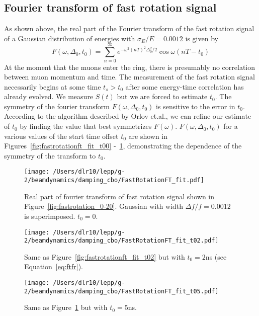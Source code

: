 \documentclass[10pt]{article}
\begin{document}
\subsection{Fourier transform of fast rotation signal}
As shown above, the real part of the Fourier transform of the fast rotation signal of a Gaussian distribution of energies with $\sigma_E/E = 0.0012$ is given by
\begin{equation}
F(\omega, \Delta_0,t_0)=\sum_{n=0}^\infty e^{-\omega^2(nT)^2\Delta_0^2/2}\cos\omega(nT-t_0)\label{eq:ftfr}
\end{equation}
At the moment that the muons enter the ring, there is presumably no correlation between muon momentum and time. The measurement of the fast rotation signal
necessarily begins at some time $t_s > t_0$ after some energy-time correlation has already evolved. We measure $S(t)$ but we are forced to
estimate $t_0$. The symmetry of the fourier transform $F(\omega,\Delta_0,t_0)$ is sensitive to the error in $t_0$.
According to the algorithm described by Orlov et.al.\cite{orlov}, we can refine our estimate of $t_0$ by finding the value that best symmetrizes $F(\omega)$.
$F(\omega,\Delta_0,t_0)$ for a various values of the start time offset $t_0$ are shown in Figures~\ref{fig:fastrotationft_fit_t00} -~\ref{fig:fastrotationft_fit_t05},
demonstrating the dependence of the symmetry of the transform to $t_0$.
\begin{figure}[htbp] %
\begin{minipage}[t]{0.32\textwidth}
   \centering
   \texttt{[image: /Users/dlr10/lepp/g-2/beamdynamics/damping\_cbo/FastRotationFT\_fit.pdf]} 
   \caption{Real part of fourier transform of fast rotation signal shown in Figure~\ref{fig:fastrotation_0-20}. Gaussian with width $\Delta f/f=0.0012$ 
is superimposed. $t_0=0$. \label{fig:fastrotationft_fit_t00}}
 \end{minipage}
\hfill
\begin{minipage}[t]{0.32\textwidth}
\centering
   \texttt{[image: /Users/dlr10/lepp/g-2/beamdynamics/damping\_cbo/FastRotationFT\_fit\_t02.pdf]} 
\caption{Same as Figure~\ref{fig:fastrotationft_fit_t02} but with $t_0=2$ns (see Equation~\ref{eq:ftfr}).
   \label{fig:fastrotationft_fit_t02}}
\end{minipage}
\hfill
\begin{minipage}[t]{0.32\textwidth}
\centering
   \texttt{[image: /Users/dlr10/lepp/g-2/beamdynamics/damping\_cbo/FastRotationFT\_fit\_t05.pdf]} 
\caption{Same as Figure~\ref{fig:fastrotationft_fit_t05} but with $t_0=5$ns.
   \label{fig:fastrotationft_fit_t05}}
\end{minipage}
\end{figure}
\end{document}
